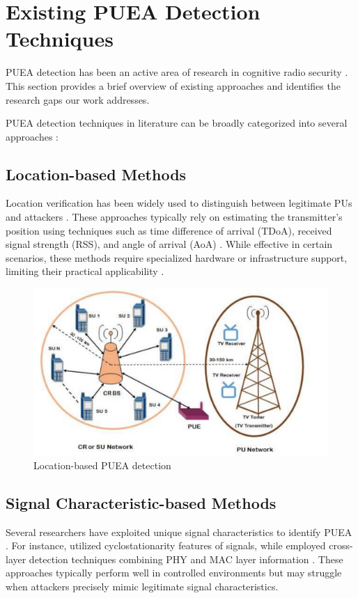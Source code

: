 \section{Existing PUEA Detection Techniques}
PUEA detection has been an active area of research in cognitive radio security \cite{ref24}. This section provides a brief overview of existing approaches and identifies the research gaps our work addresses.


PUEA detection techniques in literature can be broadly categorized into several approaches \cite{ref24,ref7}:

\subsection{Location-based Methods}
Location verification has been widely used to distinguish between legitimate PUs and attackers  \cite{ref20}. These approaches typically rely on estimating the transmitter's position using techniques such as time difference of arrival (TDoA), received signal strength (RSS), and angle of arrival (AoA) \cite{ref4,ref5}. While effective in certain scenarios, these methods require specialized hardware or infrastructure support, limiting their practical applicability \cite{ref7}.

\begin{figure}
    \centering
    \includegraphics[width=0.9\linewidth]{Figures/chapter1/location-based PUEA detection.png}
    \caption{Location-based PUEA detection \cite{ref20}}
    \label{fig:enter-label}
\end{figure}

\subsection{Signal Characteristic-based Methods}
Several researchers have exploited unique signal characteristics to identify PUEA \cite{ref11,ref6}. For instance, \cite{ref11} utilized cyclostationarity features of signals, while employed cross-layer detection techniques combining PHY and MAC layer information \cite{ref5}. These approaches typically perform well in controlled environments but may struggle when attackers precisely mimic legitimate signal characteristics\cite{ref17}.

